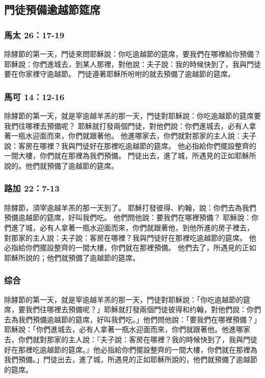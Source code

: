 
\subsection{門徒預備逾越節筵席}

\subsubsection{馬太 26：17-19}
除酵節的第一天，門徒來問耶穌說：你吃逾越節的筵席，要我們在哪裡給你預備？
耶穌說：你們進城去，到某人那裡，對他說：夫子說：我的時候快到了，我與門徒要在你家裡守逾越節。
門徒遵著耶穌所吩咐的就去預備了逾越節的筵席。
\subsubsection{馬可 14：12-16}
除酵節的第一天，就是宰逾越羊羔的那一天，門徒對耶穌說：你吃逾越節的筵席要我們往哪裡去預備呢？
耶穌就打發兩個門徒，對他們說：你們進城去，必有人拿著一瓶水迎面而來，你們就跟著他。
他進哪家去，你們就對那家的主人說：夫子說：客房在哪裡？我與門徒好在那裡吃逾越節的筵席。
他必指給你們擺設整齊的一間大樓，你們就在那裡為我們預備。
門徒出去，進了城，所遇見的正如耶穌所說的。他們就預備了逾越節的筵席。
\subsubsection{路加 22：7-13}
除酵節，須宰逾越羊羔的那一天到了。
耶穌打發彼得、約翰，說：你們去為我們預備逾越節的筵席，好叫我們吃。
他們問他說：要我們在哪裡預備？
耶穌說：你們進了城，必有人拿著一瓶水迎面而來，你們就跟著他，到他所進的房子裡去，
對那家的主人說：夫子說：客房在哪裡？我與門徒好在那裡吃逾越節的筵席。
他必指給你們擺設整齊的一間大樓，你們就在那裡預備。
他們去了，所遇見的正如耶穌所說的；他們就預備了逾越節的筵席。
\subsubsection{综合}
除酵節的第一天，就是宰逾越羊羔的那一天，門徒對耶穌說：「你吃逾越節的筵席，要我們往哪裡去預備呢？」耶穌就打發兩個門徒彼得和约翰，對他們說：你們去為我們預備逾越節的筵席，好叫我們吃。」他們問他說：「要我們在哪裡預備？」 耶穌說：「你們進城去，必有人拿著一瓶水迎面而來，你們就跟著他。他進哪家去，你們就對那家的主人說：『夫子說：客房在哪裡？我的時候快到了，我與門徒好在那裡吃逾越節的筵席。』他必指給你們擺設整齊的一間大樓，你們就在那裡為我們預備。」門徒出去，進了城，所遇見的正如耶穌所說的，他們就預備了逾越節的筵席。

